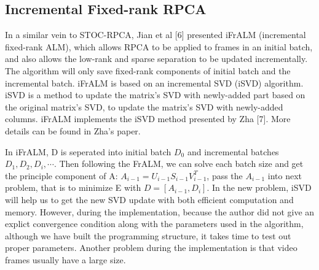\documentclass[oneside]{article}
\begin{document}
\subsection{Incremental Fixed-rank RPCA}
In a similar vein to STOC-RPCA, Jian et al [6] presented iFrALM (incremental fixed-rank ALM), which allows RPCA to be applied to frames in an initial batch, and also allows the low-rank and sparse separation to be updated incrementally. The algorithm will only save fixed-rank components of initial batch and the incremental batch.\newline\newline
iFrALM is based on an incremental SVD (iSVD) algorithm. iSVD is a method to update the matrix's SVD with newly-added part based on the original matrix's SVD, to update the matrix's SVD with newly-added columns. iFrALM implements the iSVD method presented by Zha [7]. More details can be found in Zha's paper.

In iFrALM, D is seperated into initial batch $D_0$  and incremental batches $D_1, D_2, D_i, \cdots$. Then following the FrALM, we can solve each batch size and get the principle component of A: $A_{i- 1} = U_{i-1} S_{i-1} V^T_{i-1}$, pass the $A_{i-1}$ into next problem, that is to minimize E with $D = [A_{i -1}, D_i]$. In the new problem, iSVD will help us to get the new SVD update with both efficient computation and memory.\newline\newline
However, during the implementation, because the author did not give an explict convergence condition along with the parameters used in the algorithm, although we have built the programming structure, it takes time to test out proper parameters. Another problem during the implementation is that video frames usually have a large size.
\end{document}
